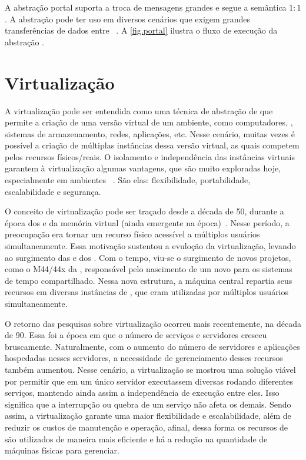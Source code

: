 A abstração portal suporta a troca de mensagens grandes e segue a semântica $1:1$. A abstração pode ter uso em diversos cenários que exigem grandes transferências de dados entre \clusters~\cite{penna:thesis}. A \autoref{fig.portal} ilustra o fluxo de execução da abstração \portal.

\section{Virtualização}
\label{sec.virtualizacao}
A virtualização pode ser entendida como uma técnica de abstração de \hardware que permite a criação de uma versão virtual de um ambiente, como computadores, \sos, sistemas de armazenamento, redes, aplicações, etc. Nesse cenário, muitas vezes é possível a criação de múltiplas instâncias dessa versão virtual, as quais competem pelos recursos físicos/reais. O isolamento e independência das instâncias virtuais garantem à virtualização algumas vantagens, que são muito exploradas hoje, especialmente em ambientes \cloud~\cite{manohar2013survey}. São elas: flexibilidade, portabilidade, escalabilidade e segurança.

O conceito de virtualização pode ser traçado desde a década de 50, durante a época dos \mainframes e da memória virtual (ainda emergente na época)~\cite{campbell2006introduction}. Nesse período, a preocupação era tornar um recurso físico acessível a múltiplos usuários simultaneamente. Essa motivação sustentou a evuloção da virtualização, levando ao surgimento das \vms e dos \hypervisors. Com o tempo, viu-se o surgimento de novos projetos, como o M44/44x da \ibm, responsável pelo nascimento de um novo \design para os sistemas de tempo compartilhado. Nessa nova estrutura, a máquina central repartia seus recursos em diversas instâncias de \vms, que eram utilizadas por múltiplos usuários simultaneamente.

O retorno das pesquisas sobre virtualização ocorreu mais recentemente, na década de 90. Essa foi a época em que o número de serviços e servidores cresceu bruscamente. Naturalmente, com o aumento do número de servidores e aplicações hospedadas nesses servidores, a necessidade de gerenciamento desses recursos também aumentou. Nesse cenário, a virtualização se mostrou uma solução viável por permitir que em um único servidor executassem diversas \vms rodando diferentes serviços, mantendo ainda assim a independência de execução entre eles. Isso significa que a interrupção ou quebra de um serviço não afeta os demais. Sendo assim, a virtualização garante uma maior flexibilidade e escalabilidade, além de reduzir os custos de manutenção e operação, afinal, dessa forma os recursos de \hardware são utilizados de maneira mais eficiente e há a redução na quantidade de máquinas físicas para gerenciar. 

